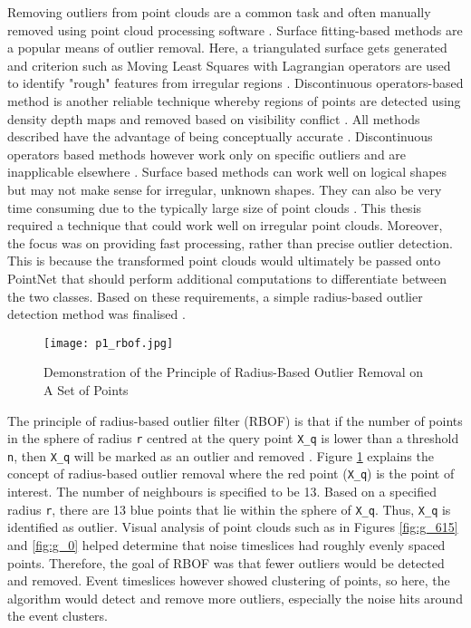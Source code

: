 Removing outliers from point clouds are a common task and often manually removed using point cloud processing software \cite{LocalChapterEvents:ItalChap:ItalianChapConf2008:129-136}. Surface fitting-based methods are a popular means of outlier removal. Here, a triangulated surface gets generated and criterion such as Moving Least Squares with Lagrangian operators are used to identify "rough" features from irregular regions \cite{lipman2007parameterization}. Discontinuous operators-based method is another reliable technique whereby regions of points are detected using density depth maps and removed based on visibility conflict \cite{qi2016hedged}. All methods described have the advantage of being conceptually accurate \cite{ning2018efficient}. Discontinuous operators based methods however work only on specific outliers and are inapplicable elsewhere \cite{qi2016hedged}. Surface based methods can work well on logical shapes but may not make sense for irregular, unknown shapes. They can also be very time consuming due to the typically large size of point clouds \cite{lipman2007parameterization, kobbelt2004survey}. This thesis required a technique that could work well on irregular point clouds. Moreover, the focus was on providing fast processing, rather than precise outlier detection. This is because the transformed point clouds would ultimately be passed onto PointNet that should perform additional computations to differentiate between the two classes. Based on these requirements, a simple radius-based outlier detection method was finalised \cite{ning2018efficient}. 

\begin{figure}[ht!]
    \centering 
    \texttt{[image: p1\_rbof.jpg]}
    \caption{Demonstration of the Principle of Radius-Based Outlier Removal on A Set of Points}
    \label{fig:p1_rbof}
\end{figure} 

The principle of radius-based outlier filter (RBOF) is that if the number of points in the sphere of radius \texttt{r} centred at the query point \texttt{X\_q} is lower than a threshold \texttt{n}, then \texttt{X\_q} will be marked as an outlier and removed \cite{li2019overlapping}. Figure \ref{fig:p1_rbof} explains the concept of radius-based outlier removal where the red point (\texttt{X\_q}) is the point of interest. The number of neighbours is specified to be 13. Based on a specified radius \texttt{r}, there are 13 blue points that lie within the sphere of \texttt{X\_q}. Thus, \texttt{X\_q} is identified as outlier. Visual analysis of point clouds such as in Figures \ref{fig:g_615} and \ref{fig:g_0} helped determine that noise timeslices had roughly evenly spaced points. Therefore, the goal of RBOF was that fewer outliers would be detected and removed. Event timeslices however showed clustering of points, so here, the algorithm would detect and remove more outliers, especially the noise hits around the event clusters. 

